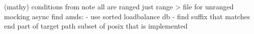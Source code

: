 (mathy) conditions from 
note all are ranged just range > file for unranged
mocking
async
find amds: 
	- use sorted loadbalance db
	- find suffix that matches end part of target path
subset of \ac{posix} that is implemented
